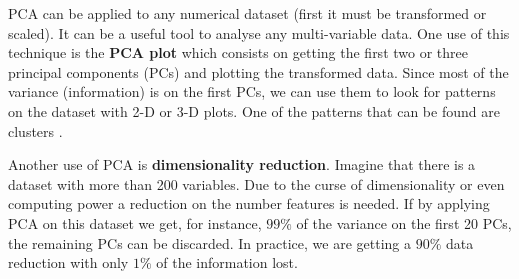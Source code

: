PCA can be applied to any numerical dataset \cite{wold1987principal} (first it must be transformed or scaled). It can be a useful tool to analyse any multi-variable data. One use of this technique is the \textbf{PCA plot} which consists on getting the first two or three principal components (PCs) and plotting the transformed data. Since most of the variance (information) is on the first PCs, we can use them to look for patterns on the dataset with 2-D or 3-D plots. One of the patterns that can be found are clusters \cite{ding2004k}. 

Another use of PCA is \textbf{dimensionality reduction}. Imagine that there is a dataset with more than 200 variables. Due to the curse of dimensionality \cite{Bellman:2010:DP:1893145} or even computing power a reduction on the number features is needed. If by applying PCA on this dataset we get, for instance, $99\%$ of the variance on the first 20 PCs, the remaining PCs can be discarded. In practice, we are getting a $90\%$ data reduction with only $1\%$ of the information lost.






